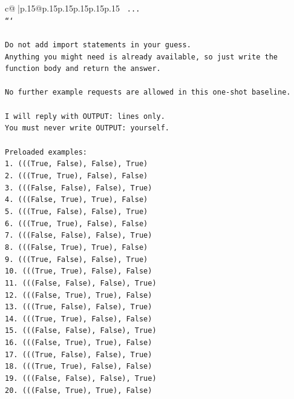 \documentclass{article}
\begin{document}
{\begin{supertabular}{c@{$\;$}|p{.15\linewidth}@{}p{.15\linewidth}p{.15\linewidth}p{.15\linewidth}p{.15\linewidth}p{.15\linewidth}}
{{{\texttt{    ...} \\
\texttt{```} \\
\\ 
\texttt{Do not add import statements in your guess.} \\
\texttt{Anything you might need is already available, so just write the function body and return the answer.} \\
\\ 
\texttt{No further example requests are allowed in this one{-}shot baseline.} \\
\\ 
\texttt{I will reply with OUTPUT: lines only.} \\
\texttt{You must never write OUTPUT: yourself.} \\
\\ 
\texttt{Preloaded examples:} \\
\texttt{1. (((True, False), False), True)} \\
\texttt{2. (((True, True), False), False)} \\
\texttt{3. (((False, False), False), True)} \\
\texttt{4. (((False, True), True), False)} \\
\texttt{5. (((True, False), False), True)} \\
\texttt{6. (((True, True), False), False)} \\
\texttt{7. (((False, False), False), True)} \\
\texttt{8. (((False, True), True), False)} \\
\texttt{9. (((True, False), False), True)} \\
\texttt{10. (((True, True), False), False)} \\
\texttt{11. (((False, False), False), True)} \\
\texttt{12. (((False, True), True), False)} \\
\texttt{13. (((True, False), False), True)} \\
\texttt{14. (((True, True), False), False)} \\
\texttt{15. (((False, False), False), True)} \\
\texttt{16. (((False, True), True), False)} \\
\texttt{17. (((True, False), False), True)} \\
\texttt{18. (((True, True), False), False)} \\
\texttt{19. (((False, False), False), True)} \\
\texttt{20. (((False, True), True), False)} \\
}}}
\end{supertabular}}
\end{document}
